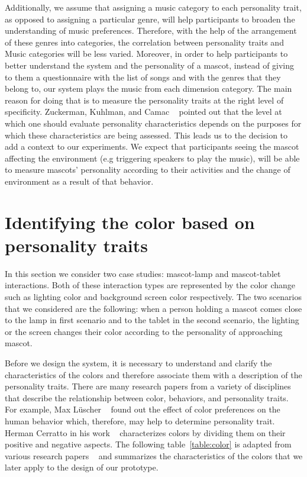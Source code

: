 \par Additionally, we assume that assigning a music category to each personality trait,
as opposed to assigning a particular genre, will help participants to broaden the understanding of music preferences.
Therefore, with the help of the arrangement of these genres into categories,
the correlation between personality traits and Music categories will be less varied.
Moreover, in order to help participants to better understand the system and the personality of a mascot,
instead of giving to them a questionnaire with the list of songs and with the genres that they
belong to, our system plays the music from each dimension category.
The main reason for doing that is to measure the personality traits at the right level of specificity.
Zuckerman, Kuhlman, and Camac ~\cite{zuckerman1988lies} pointed out that the level at which one
should evaluate personality characteristics depends on the purposes for which these characteristics are being assessed.
This leads us to the decision to add a context to our experiments.
We expect that participants seeing the mascot affecting the environment
(e.g triggering speakers to play the music), will be able to measure mascots'
personality according to their activities and the change of environment as a result of that behavior.

\section{Identifying the color based on personality traits}
\label{sec:Identifying the color based on personality traits}

In this section we consider two case studies: mascot-lamp and mascot-tablet interactions.
Both of these interaction types are represented by the color change such as
lighting color and background screen color respectively.
The two scenarios that we considered are the following: when a person holding a mascot comes close
to the lamp in first scenario and to the tablet in the second scenario, the lighting
or the screen changes their color according to the personality of approaching mascot.

Before we design the system, it is necessary to understand and clarify the characteristics
of the colors and therefore associate them with a description of the personality traits.
There are many research papers from a variety of disciplines that describe the
relationship between color, behaviors, and personality traits.
For example, Max Lüscher ~\cite{luscher1971luscher} found out the effect of
color preferences on the human behavior which, therefore, may help to determine personality trait.
Herman Cerratto in his work ~\cite{cerrato2012meaning} characterizes colors by
dividing them on their positive and negative aspects.
The following table~\ref{table:color} is adapted from various research
papers ~\cite{luscher1971luscher,cerrato2012meaning,schaie1964color} and
summarizes the characteristics of the colors that we later apply to the design of our prototype.

